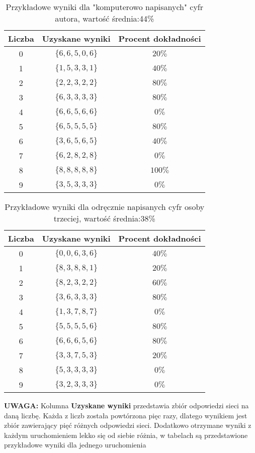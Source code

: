 \documentclass[a4paper,14pt]{report}
\begin{document}
	\begin{table}[h!]
	\centering
	\begin{tabular}{|c | c | c |}
	 \hline
	 Liczba & Uzyskane wyniki & Procent dokładności \\
	 \hline\hline
	 0 & $\{6,6,5,0,6\}$ &  $20\%$ \\
	 1 & $\{1,5,3,3,1\}$ & $40\%$   \\
	 2 & $\{2,2,3,2,2\}$ & $80\%$   \\
	 3 & $\{6,3,3,3,3\}$ & $80\%$   \\
	 4 & $\{6,6,5,6,6\}$ & $0\%$   \\
	 5 & $\{6,5,5,5,5\}$ & $80\%$   \\
	 6 & $\{3,6,5,6,5\}$ & $40\%$   \\
	 7 & $\{6,2,8,2,8\}$ & $0\%$   \\
	 8 & $\{8,8,8,8,8\}$ & $100\%$   \\
	 9 & $\{3,5,3,3,3\}$ & $0\%$   \\
	 \hline
	\end{tabular}
	\caption{Przykładowe wyniki dla "komputerowo napisanych" cyfr autora, wartość średnia:44\%}
	\label{WynikiKompAutor}
	\end{table}

	\begin{table}[h!]
	\centering
	\begin{tabular}{|c | c | c |}
	 \hline
	 Liczba & Uzyskane wyniki & Procent dokładności \\
	 \hline\hline
	 0 & $\{0,0,6,3,6\}$ &  $40\%$ \\
	 1 & $\{8,3,8,8,1\}$ & $20\%$   \\
	 2 & $\{8,2,3,2,2\}$ & $60\%$   \\
	 3 & $\{3,6,3,3,3\}$ & $80\%$   \\
	 4 & $\{1,3,7,8,7\}$ & $0\%$   \\
	 5 & $\{5,5,5,5,6\}$ & $80\%$   \\
	 6 & $\{6,6,6,5,6\}$ & $80\%$   \\
	 7 & $\{3,3,7,5,3\}$ & $20\%$   \\
	 8 & $\{5,3,3,3,3\}$ & $0\%$   \\
	 9 & $\{3,2,3,3,3\}$ & $0\%$   \\
	 \hline
	\end{tabular}
	\caption{Przykładowe wyniki dla odręcznie napisanych cyfr osoby trzeciej, wartość średnia:38\%}
	\label{WynikiOdrecznieSiostra}
	\end{table}
	\textbf{UWAGA:} Kolumna \textbf{Uzyskane wyniki} przedstawia zbiór odpowiedzi sieci na daną liczbę. Każda z liczb została powtórzona pięc razy, dlatego wynikiem jest zbiór zawierający pięć różnych odpowiedzi sieci. Dodatkowo otrzymane wyniki z każdym uruchomieniem lekko się od siebie różnia, w tabelach są przedstawione przykładowe wyniki dla jednego uruchomienia
\end{document}
